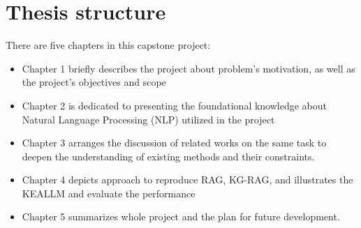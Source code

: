 \section{Thesis structure}
There are five chapters in this capstone project:
\begin{itemize}
    \item Chapter 1 briefly describes the project about problem’s motivation, as well as the project’s objectives and scope
    \item Chapter 2 is dedicated to presenting the foundational knowledge about Natural Language Processing (NLP) utilized in the project
    \item Chapter 3 arranges the discussion of related works on the same task to deepen the understanding of existing methods and their constraints.
    
    \item Chapter 4 depicts approach to reproduce RAG, KG-RAG, and illustrates the KEALLM and evaluate the performance
    \item Chapter 5 summarizes whole project and the plan for future development.
\end{itemize}